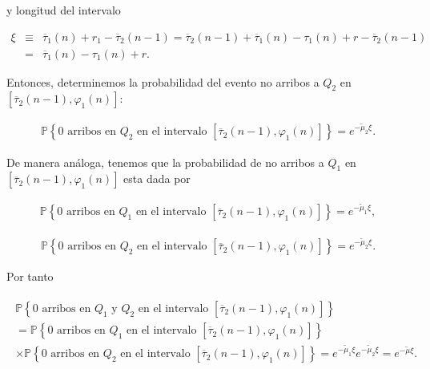 \documentclass{article}
\newcommand{\prob}{\mathbb{P}}
\begin{document}
y longitud del intervalo

\begin{eqnarray*}
\xi&\equiv&\overline{\tau}_{1}\left(n\right)+r_{1}-\overline{\tau}_{2}\left(n-1\right)
=\overline{\tau}_{2}\left(n-1\right)+\overline{\tau}_{1}\left(n\right)-\tau_{1}\left(n\right)+r-\overline{\tau}_{2}\left(n-1\right)\\
&=&\overline{\tau}_{1}\left(n\right)-\tau_{1}\left(n\right)+r.
\end{eqnarray*}


Entonces, determinemos la probabilidad del evento no arribos a $Q_{2}$ en $\left[\overline{\tau}_{2}\left(n-1\right),\varphi_{1}\left(n\right)\right]$:

\begin{eqnarray}
\prob\left\{0 \textrm{ arribos en }Q_{2}\textrm{ en el intervalo }\left[\overline{\tau}_{2}\left(n-1\right),\varphi_{1}\left(n\right)\right]\right\}
=e^{-\tilde{\mu}_{2}\xi}.
\end{eqnarray}

De manera an\'aloga, tenemos que la probabilidad de no arribos a $Q_{1}$ en $\left[\overline{\tau}_{2}\left(n-1\right),\varphi_{1}\left(n\right)\right]$ esta dada por

\begin{eqnarray}
\prob\left\{0 \textrm{ arribos en }Q_{1}\textrm{ en el intervalo }\left[\overline{\tau}_{2}\left(n-1\right),\varphi_{1}\left(n\right)\right]\right\}
=e^{-\tilde{\mu}_{1}\xi},
\end{eqnarray}

\begin{eqnarray}
\prob\left\{0 \textrm{ arribos en }Q_{2}\textrm{ en el intervalo }\left[\overline{\tau}_{2}\left(n-1\right),\varphi_{1}\left(n\right)\right]\right\}
=e^{-\tilde{\mu}_{2}\xi}.
\end{eqnarray}

Por tanto 

\begin{eqnarray}
\begin{array}{l}
\prob\left\{0 \textrm{ arribos en }Q_{1}\textrm{ y }Q_{2}\textrm{ en el intervalo }\left[\overline{\tau}_{2}\left(n-1\right),\varphi_{1}\left(n\right)\right]\right\}\\
=\prob\left\{0 \textrm{ arribos en }Q_{1}\textrm{ en el intervalo }\left[\overline{\tau}_{2}\left(n-1\right),\varphi_{1}\left(n\right)\right]\right\}\\
\times
\prob\left\{0 \textrm{ arribos en }Q_{2}\textrm{ en el intervalo }\left[\overline{\tau}_{2}\left(n-1\right),\varphi_{1}\left(n\right)\right]\right\}=e^{-\tilde{\mu}_{1}\xi}e^{-\tilde{\mu}_{2}\xi}
=e^{-\tilde{\mu}\xi}.
\end{array}
\end{eqnarray}
\end{document}
